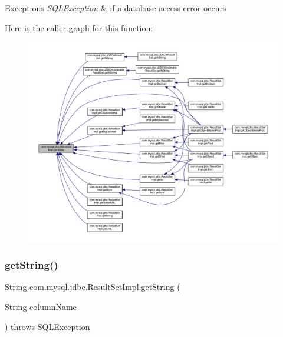 \begin{DoxyExceptions}{Exceptions}
{\em S\+Q\+L\+Exception} & if a database access error occurs \\
\hline
\end{DoxyExceptions}
Here is the caller graph for this function\+:
\nopagebreak
\begin{figure}[H]
\begin{center}
\leavevmode
\includegraphics[width=350pt]{classcom_1_1mysql_1_1jdbc_1_1_result_set_impl_a2f04584d83a8ddae4774dfaeb1a1aac7_icgraph}
\end{center}
\end{figure}
\mbox{\label{classcom_1_1mysql_1_1jdbc_1_1_result_set_impl_ac3392db13c1e1bd57aa8e641ea282fcf}} 
\subsubsection{\texorpdfstring{get\+String()}{getString()}\hspace{0.1cm}{\footnotesize\ttfamily [2/2]}}
{\footnotesize\ttfamily String com.\+mysql.\+jdbc.\+Result\+Set\+Impl.\+get\+String (\begin{DoxyParamCaption}\item[{String}]{column\+Name }\end{DoxyParamCaption}) throws S\+Q\+L\+Exception}

